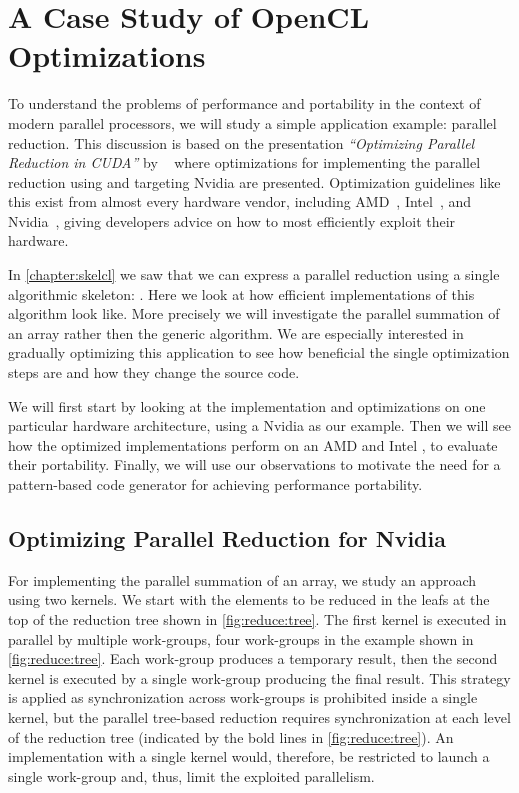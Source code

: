\section{A Case Study of OpenCL Optimizations}
\label{sec:reduce:case-study}
\label{section:reduce:case-study}
To understand the problems of performance and portability in the context of modern parallel processors, we will study a simple application example: parallel reduction.
This discussion is based on the presentation \emph{``Optimizing Parallel Reduction in CUDA''} by \citeauthor{Harris2007}~\cite{Harris2007} where optimizations for implementing the parallel reduction using \CUDA and targeting Nvidia \GPUs are presented.
Optimization guidelines like this exist from almost every hardware vendor, including AMD~\cite{AMDProgrammingGuide}, Intel~\cite{IntelGPUProgrammingGuide, IntelXeonProgrammingGuide}, and Nvidia~\cite{CUDAProgrammingGuide}, giving developers advice on how to most efficiently exploit their hardware.

In \autoref{chapter:skelcl} we saw that we can express a parallel reduction using a single algorithmic skeleton: \reduce.
Here we look at how efficient \OpenCL implementations of this algorithm look like.
More precisely we will investigate the parallel summation of an array rather then the generic \reduce algorithm.
We are especially interested in gradually optimizing this application to see how beneficial the single optimization steps are and how they change the source code.

We will first start by looking at the implementation and optimizations on one particular hardware architecture, using a Nvidia \GPU as our example.
Then we will see how the optimized implementations perform on an AMD \GPU and Intel \CPU, to evaluate their portability.
Finally, we will use our observations to motivate the need for a pattern-based code generator for achieving performance portability.

\subsection{Optimizing Parallel Reduction for Nvidia \GPUs}
For implementing the parallel summation of an array, we study an approach using two \OpenCL kernels.
We start with the elements to be reduced in the leafs at the top of the reduction tree shown in \autoref{fig:reduce:tree}.
The first \OpenCL kernel is executed in parallel by multiple \OpenCL work-groups, four work-groups in the example shown in \autoref{fig:reduce:tree}.
Each work-group produces a temporary result, then the second \OpenCL kernel is executed by a single \OpenCL work-group producing the final result.
This strategy is applied as synchronization across work-groups is prohibited inside a single \OpenCL kernel, but the parallel tree-based reduction requires synchronization at each level of the reduction tree (indicated by the bold lines in \autoref{fig:reduce:tree}).
An implementation with a single \OpenCL kernel would, therefore, be restricted to launch a single \OpenCL work-group and, thus, limit the exploited parallelism.

